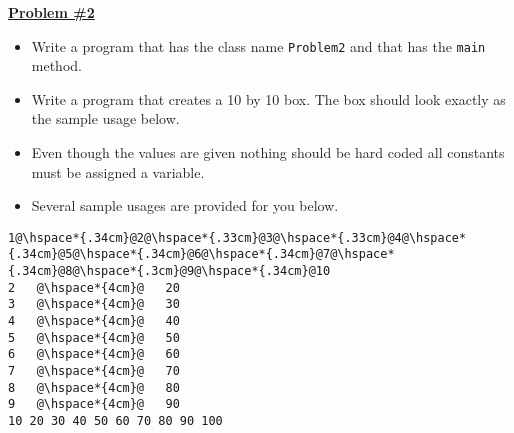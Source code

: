 \documentclass[12pt]{article}
\begin{document}
\vspace*{0.5cm}
\noindent\underline{\textbf{Problem \#2}}
\begin{itemize}
	\item Write a program that has the class name \texttt{Problem2} and that has the \texttt{main} method. 
	\item Write a program that creates a 10 by 10 box. The box should look exactly as the sample usage below. 
	\item Even though the values are given nothing should be hard coded all constants must be assigned a variable.
	\item Several sample usages are provided for you below. 
\end{itemize}
\begin{center}
\hspace*{.5cm}
\begin{minipage}{10cm}
\begin{lstlisting}[escapechar=@]
1@\hspace*{.34cm}@2@\hspace*{.33cm}@3@\hspace*{.33cm}@4@\hspace*{.34cm}@5@\hspace*{.34cm}@6@\hspace*{.34cm}@7@\hspace*{.34cm}@8@\hspace*{.3cm}@9@\hspace*{.34cm}@10
2   @\hspace*{4cm}@   20 
3   @\hspace*{4cm}@   30 
4   @\hspace*{4cm}@   40 
5   @\hspace*{4cm}@   50 
6   @\hspace*{4cm}@   60 
7   @\hspace*{4cm}@   70 
8   @\hspace*{4cm}@   80 
9   @\hspace*{4cm}@   90 
10 20 30 40 50 60 70 80 90 100 
\end{lstlisting}
\end{minipage}\\
\end{center}
\end{document}
